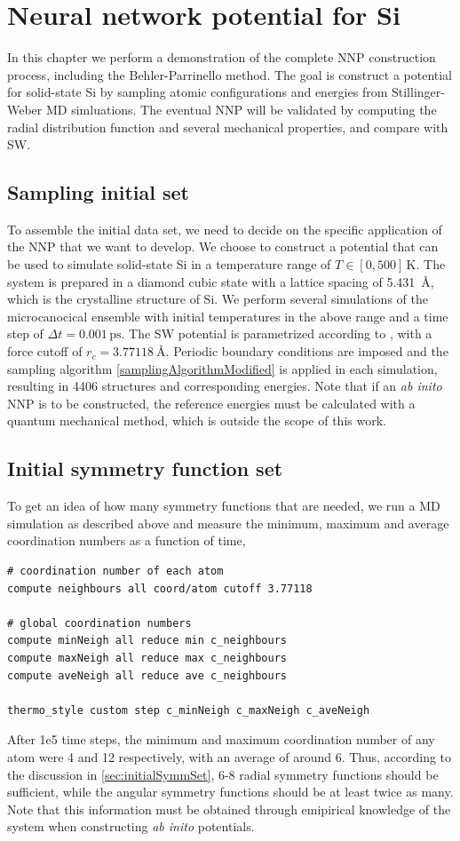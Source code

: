 \documentclass[twoside,english]{uiofysmaster}
\begin{document}
\chapter{Neural network potential for Si} \label{sec:SiPotentialResults}
In this chapter we perform a demonstration of the complete NNP construction process, including 
the Behler-Parrinello method. The goal is construct a potential for solid-state Si by sampling atomic configurations 
and energies from Stillinger-Weber MD simluations. 
The eventual NNP will be validated by computing the radial distribution function and several mechanical properties, and compare
with SW. 

\section{Sampling initial set}
To assemble the initial data set, we need to decide on the specific application of the NNP that we want to develop. 
We choose to construct a potential that can be used to simulate solid-state Si in a temperature range of $T \in [0, 500] \, \mathrm{K}$. 
The system is prepared in a diamond cubic state with a lattice spacing of \SI{5.431}{\angstrom}, which is 
the crystalline structure of Si. We perform several simulations of the microcanocical ensemble with initial temperatures
in the above range and a time step of $\Delta t = 0.001 \, \mathrm{ps}$.
The SW potential is parametrized according to \cite{Stillinger85}, with a force cutoff 
of $r_c = \SI{3.77118}{\angstrom}$. 
Periodic boundary conditions are imposed and the sampling algorithm 
\eqref{samplingAlgorithmModified} is applied in each simulation, resulting in 4406 structures and corresponding energies.
Note that if an \textit{ab inito} NNP is to be constructed, the reference energies must be calculated with a
quantum mechanical method, which is outside the scope of this work.

\section{Initial symmetry function set}
To get an idea of how many symmetry functions that are needed, we run a MD simulation as described above and 
measure the minimum, maximum and average coordination numbers as a function of time, 
\begin{lstlisting}[style=lammps]
# coordination number of each atom
compute neighbours all coord/atom cutoff 3.77118

# global coordination numbers
compute minNeigh all reduce min c_neighbours
compute maxNeigh all reduce max c_neighbours
compute aveNeigh all reduce ave c_neighbours

thermo_style custom step c_minNeigh c_maxNeigh c_aveNeigh 
\end{lstlisting}
After 1e5 time steps, the minimum and maximum coordination number of any atom were 4 and 12 respectively, with an average 
of around 6. Thus, according to the discussion in \autoref{sec:initialSymmSet}, 6-8 radial symmetry functions should be sufficient, 
while the angular symmetry functions should be at least twice as many. Note that this information must be obtained through 
emipirical knowledge of the system when constructing \textit{ab inito} potentials. 
\end{document}
